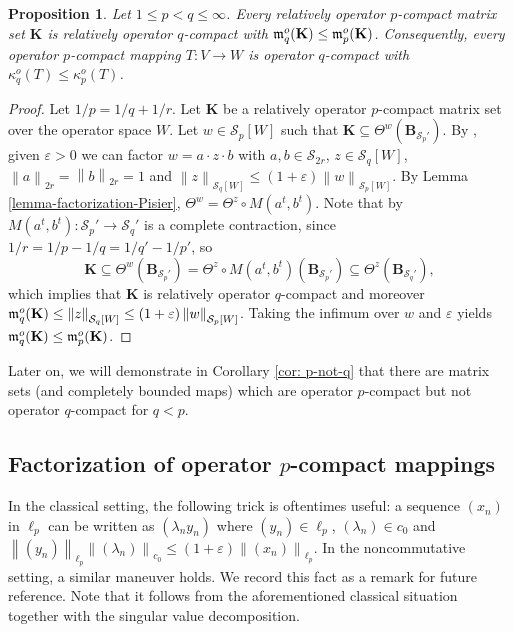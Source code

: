 \documentclass[11pt]{amsart}
\newcommand{\n}[1]{ \left\|#1\right\| }
\newtheorem{proposition}[theorem]{Proposition}
\numberwithin{equation}{section}
\begin{document}
\begin{proposition}\label{prop-monotonicity-compactness}
Let $1 \le p < q \le \infty$.
Every relatively operator $p$-compact matrix set $\mathbf{K}$ is relatively operator $q$-compact with $\frak m_q^o(\mathbf{K})\le \frak m_p^o(\mathbf{K})$. 
Consequently, every operator $p$-compact mapping $T:V \to W$ is operator $q$-compact with $\kappa_q^o(T)\le \kappa_p^o(T)$.
\end{proposition}

\begin{proof}
Let $1/p = 1/q+1/r$.
Let $\mathbf{K}$ be a relatively operator $p$-compact matrix set over the operator space $W$.
Let $w \in \mathcal{S}_p[W]$ such that $\mathbf{K} \subseteq \Theta^w( \mathbf{B}_{\mathcal{S}_{p}'})$.
By \cite[Lem. 4.2]{CD-completely-mixing}, given $\varepsilon>0$ we can factor $w = a \cdot z \cdot b$ with $a,b \in \mathcal{S}_{2r}$, $z \in \mathcal{S}_q[W]$, $\n{a}_{2r} = \n{b}_{2r} =1$ and $\n{z}_{\mathcal{S}_q[W]} \le (1+\varepsilon)\n{w}_{\mathcal{S}_p[W]}$.
By Lemma \ref{lemma-factorization-Pisier}, $\Theta^w = \Theta^z \circ M(a^t, b^t)$.
Note that by \cite[Thm. 2.1]{Oikhberg} $M(a^t,b^t) : \mathcal{S}_{p}' \to \mathcal{S}_{q}'$ is a complete contraction, since $1/r = 1/p - 1/q = 1/q'-1/p'$, so
\[
\mathbf{K}  \subseteq \Theta^w( \mathbf{B}_{\mathcal{S}_{p}'} ) = \Theta^z \circ M(a^t, b^t)( \mathbf{B}_{\mathcal{S}_{p}'} ) \subseteq \Theta^z ( \mathbf{B}_{\mathcal{S}_{q}'} ),
\]
which implies that $\mathbf{K}$ is relatively operator $q$-compact and moreover $\frak m_q^o(\mathbf{K}) \le \n{z}_{\mathcal{S}_q[W]} \le (1+\varepsilon) \n{w}_{\mathcal{S}_p[W]}$.
Taking the infimum over $w$ and $\varepsilon$ yields $\frak m_q^o(\mathbf{K})\le \frak m_p^o(\mathbf{K})$.
\end{proof}


Later on, we will demonstrate in Corollary \ref{cor: p-not-q} that there are matrix sets (and completely bounded maps) which are operator $p$-compact but not operator $q$-compact for $q < p$.




\subsection{Factorization of operator $p$-compact mappings}

In the classical setting, the following trick is oftentimes useful: a sequence $(x_n)$ in $\ell_p$ can be written as $(\lambda_ny_n)$ where  $(y_n) \in \ell_p$, $(\lambda_n)\in c_0$ and $\n{(y_n)}_{\ell_p}\n{(\lambda_n)}_{c_0} \le (1+\varepsilon)\n{(x_n)}_{\ell_p}$.
In the noncommutative setting, a similar maneuver holds. We record this  fact as a remark for future reference. Note that it follows from the aforementioned classical situation together with the singular value decomposition.
\end{document}

